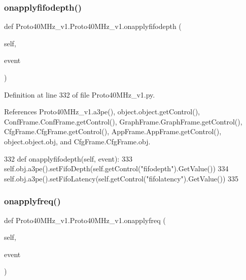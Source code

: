 \subsubsection{\texorpdfstring{onapplyfifodepth()}{onapplyfifodepth()}}
{\footnotesize\ttfamily def Proto40\+M\+Hz\+\_\+v1.\+Proto40\+M\+Hz\+\_\+v1.\+onapplyfifodepth (\begin{DoxyParamCaption}\item[{}]{self,  }\item[{}]{event }\end{DoxyParamCaption})}



Definition at line 332 of file Proto40\+M\+Hz\+\_\+v1.\+py.



References Proto40\+M\+Hz\+\_\+v1.\+a3pe(), object.\+object.\+get\+Control(), Conf\+Frame.\+Conf\+Frame.\+get\+Control(), Graph\+Frame.\+Graph\+Frame.\+get\+Control(), Cfg\+Frame.\+Cfg\+Frame.\+get\+Control(), App\+Frame.\+App\+Frame.\+get\+Control(), object.\+object.\+obj, and Cfg\+Frame.\+Cfg\+Frame.\+obj.


\begin{DoxyCode}
332     \textcolor{keyword}{def }onapplyfifodepth(self, event):
333         self.obj.a3pe().setFifoDepth(self.getControl(\textcolor{stringliteral}{"fifodepth"}).GetValue())
334         self.obj.a3pe().setFifoLatency(self.getControl(\textcolor{stringliteral}{"fifolatency"}).GetValue())
335 
\end{DoxyCode}
\mbox{\label{classProto40MHz__v1_1_1Proto40MHz__v1_a5b5aed6590a3c371680928a7d678583e}} 
\subsubsection{\texorpdfstring{onapplyfreq()}{onapplyfreq()}}
{\footnotesize\ttfamily def Proto40\+M\+Hz\+\_\+v1.\+Proto40\+M\+Hz\+\_\+v1.\+onapplyfreq (\begin{DoxyParamCaption}\item[{}]{self,  }\item[{}]{event }\end{DoxyParamCaption})}



